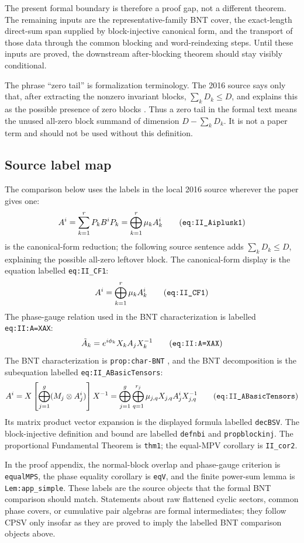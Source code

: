 \documentclass{article}
\begin{document}
The present formal boundary is therefore a proof gap, not a different theorem.
The remaining inputs are the representative-family BNT cover, the exact-length
direct-sum span supplied by block-injective canonical form, and the transport of
those data through the common blocking and word-reindexing steps. Until these
inputs are proved, the downstream after-blocking theorem should stay visibly
conditional.

The phrase ``zero tail'' is formalization terminology. The 2016 source says
only that, after extracting the nonzero invariant blocks,
$\sum_k D_k \le D$, and explains this as the possible presence of zero blocks
\cite[lines~214--219]{Cirac2016MPDO_arXiv}. Thus a zero tail in the formal
text means the unused all-zero block summand of dimension
$D - \sum_k D_k$. It is not a paper term and should not be used without this
definition.

\subsection{Source label map}

The comparison below uses the labels in the local 2016 source wherever the
paper gives one:
\[
  A^i = \sum_{k=1}^r P_k B^i P_k
      = \bigoplus_{k=1}^r \mu_k A_k^i
  \tag{\texttt{eq:II\_Aiplusk1}}
\]
is the canonical-form reduction; the following source sentence adds
$\sum_k D_k \le D$, explaining the possible all-zero leftover block. The
canonical-form display is the equation labelled \texttt{eq:II\_CF1}:
\[
  A^i = \bigoplus_{k=1}^r \mu_k A_k^i
  \tag{\texttt{eq:II\_CF1}}
\]
The phase-gauge relation used in the BNT characterization is labelled
\texttt{eq:II:A=XAX}:
\[
  \tilde A_k = e^{i\phi_k} X_k A_j X_k^{-1}
  \tag{\texttt{eq:II:A=XAX}}
\]
The BNT characterization is \texttt{prop:char-BNT}
\cite[lines~278--280 and 1135--1148]{Cirac2016MPDO_arXiv}, and the BNT
decomposition is
the subequation labelled \texttt{eq:II\_ABasicTensors}:
\[
  A^i =
  X\left[\bigoplus_{j=1}^g(M_j\otimes A_j^i)\right]X^{-1}
  =
  \bigoplus_{j=1}^g\bigoplus_{q=1}^{r_j}
    \mu_{j,q}X_{j,q}A_j^iX_{j,q}^{-1}
  \tag{\texttt{eq:II\_ABasicTensors}}
\]
Its matrix product vector expansion is the displayed formula labelled
\texttt{decBSV}. The block-injective definition and bound are labelled
\texttt{defnbi} and \texttt{propblockinj}. The proportional Fundamental
Theorem is \texttt{thm1}; the equal-MPV corollary is \texttt{II\_cor2}.

In the proof appendix, the normal-block overlap and phase-gauge criterion is
\texttt{equalMPS}, the phase equality corollary is \texttt{eqV}, and the finite
power-sum lemma is \texttt{Lem:app\_simple}. These labels are the source
objects that the formal BNT comparison should match. Statements about raw
flattened cyclic sectors, common phase covers, or cumulative pair algebras are
formal intermediates; they follow CPSV only insofar as they are proved
to imply the labelled BNT comparison objects above.
\end{document}
